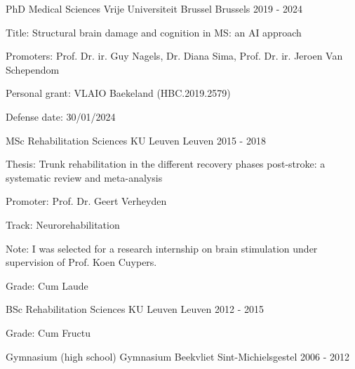 
\begin{cventries}\cventry
    {PhD Medical Sciences} %
    {Vrije Universiteit Brussel} %
    {Brussels} %
    {2019 - 2024} %
    {\begin{cvitems}\item {Title: Structural brain damage and cognition in MS: an AI approach}\item {Promoters: Prof. Dr. ir. Guy Nagels, Dr. Diana Sima, Prof. Dr. ir. Jeroen Van Schependom}\item {Personal grant: VLAIO Baekeland (HBC.2019.2579)}\item {Defense date: 30/01/2024}\end{cvitems}}%
    {} %
  \vspace{0.5cm}
\cventry
    {MSc Rehabilitation Sciences} %
    {KU Leuven} %
    {Leuven} %
    {2015 - 2018} %
    {\begin{cvitems}\item {Thesis: Trunk rehabilitation in the different recovery phases post-stroke: a systematic review and meta-analysis}\item {Promoter: Prof. Dr. Geert Verheyden}\item {Track: Neurorehabilitation}\item {Note: I was selected for a research internship on brain stimulation under supervision of Prof. Koen Cuypers.}\item {Grade: Cum Laude}\end{cvitems}}%
    {} %
  \vspace{0.5cm}
\cventry
    {BSc Rehabilitation Sciences} %
    {KU Leuven} %
    {Leuven} %
    {2012 - 2015} %
    {\begin{cvitems}\item {Grade: Cum Fructu}\end{cvitems}}%
    {} %
  \vspace{0.5cm}
\cventry
    {Gymnasium (high school)} %
    {Gymnasium Beekvliet} %
    {Sint-Michielsgestel} %
    {2006 - 2012} %
    {}%
    {} %
  \vspace{0.5cm}

\end{cventries}
